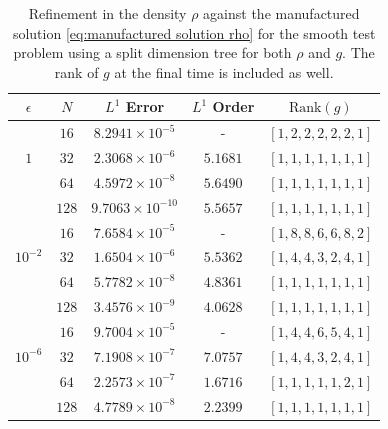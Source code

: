 \documentclass[onefignum,onetabnum]{siamart220329}
\begin{document}
\begin{table}[!ht]
    \footnotesize
    \caption{Refinement in the density $\rho$ against the manufactured solution \eqref{eq:manufactured solution rho} for the smooth test problem using a split dimension tree for both $\rho$ and $g$. The rank of $g$ at the final time is included as well.}
    \label{tab:manufactured test IMEX-3 split}
    \begin{center}
    \begin{tabular}{| c || c || c || c || c |}
        \hline
        $\epsilon$ & $N$ & $L^{1}$ Error & $L^{1}$ Order & $\text{Rank}(g)$ \\
        \hline
                           & $16$  & $8.2941 \times 10^{-5}$  & -        & $[1,2,2,2,2,2,1]$ \\
         $1$               & $32$  & $2.3068 \times 10^{-6}$  & $5.1681$ & $[1,1,1,1,1,1,1]$ \\
                           & $64$  & $4.5972 \times 10^{-8}$  & $5.6490$ & $[1,1,1,1,1,1,1]$ \\
                           & $128$ & $9.7063 \times 10^{-10}$ & $5.5657$ & $[1,1,1,1,1,1,1]$ \\
        \hline
                           & $16$  & $7.6584 \times 10^{-5}$ & -        & $[1,8,8,6,6,8,2]$ \\
         $10^{-2}$         & $32$  & $1.6504 \times 10^{-6}$ & $5.5362$ & $[1,4,4,3,2,4,1]$ \\
                           & $64$  & $5.7782 \times 10^{-8}$ & $4.8361$ & $[1,1,1,1,1,1,1]$ \\
                           & $128$ & $3.4576 \times 10^{-9}$ & $4.0628$ & $[1,1,1,1,1,1,1]$ \\
        \hline
                           & $16$  & $9.7004 \times 10^{-5}$ & -        & $[1,4,4,6,5,4,1]$ \\
         $10^{-6}$         & $32$  & $7.1908 \times 10^{-7}$ & $7.0757$ & $[1,4,4,3,2,4,1]$ \\
                           & $64$  & $2.2573 \times 10^{-7}$ & $1.6716$ & $[1,1,1,1,1,2,1]$ \\
                           & $128$ & $4.7789 \times 10^{-8}$ & $2.2399$ & $[1,1,1,1,1,1,1]$ \\
        \hline
    \end{tabular}
    \end{center}
\end{table}
\end{document}
